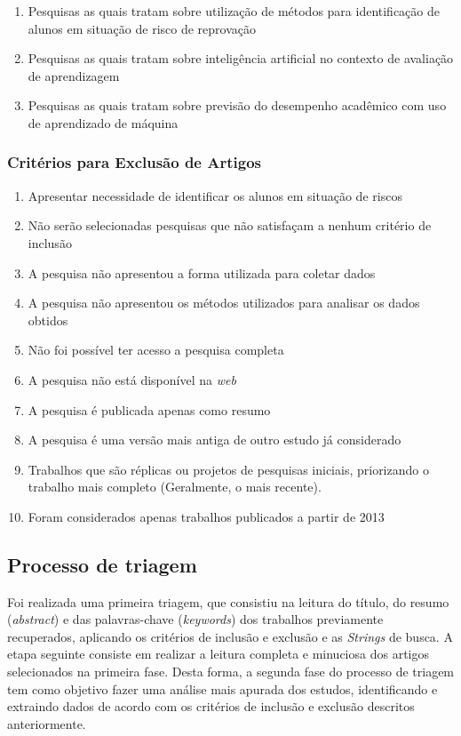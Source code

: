 \documentclass[
	12pt,				%
	openright,			%
	oneside,
	a4paper,			%
	english,			%
	french,				%
	spanish,			%
	brazil,				%
	]{abntex2}
\begin{document}
\begin{enumerate}
    \item Pesquisas as quais tratam sobre utilização de métodos para identificação de alunos em situação de risco de reprovação
    \item Pesquisas as quais tratam sobre inteligência artificial no contexto de avaliação de aprendizagem
    \item Pesquisas as quais tratam sobre previsão do desempenho acadêmico com uso de aprendizado de máquina
\end{enumerate}

\subsubsection{Critérios para Exclusão de Artigos}
\begin{enumerate}
    \item Apresentar necessidade de identificar os alunos em situação de riscos
    \item Não serão selecionadas pesquisas que não satisfaçam a nenhum critério de inclusão
    \item A pesquisa não apresentou a forma utilizada para coletar dados
    \item A pesquisa não apresentou os métodos utilizados para analisar os dados obtidos
    \item Não foi possível ter acesso a pesquisa completa
    \item A pesquisa não está disponível na \textit{web}
    \item A pesquisa é publicada apenas como resumo
    \item A pesquisa é uma versão mais antiga de outro estudo já considerado
    \item Trabalhos que são réplicas ou projetos de pesquisas iniciais, priorizando o trabalho mais completo (Geralmente, o mais recente).
    \item Foram considerados apenas trabalhos publicados a partir de 2013
\end{enumerate}

\subsection{Processo de triagem}
Foi realizada uma primeira triagem, que consistiu na leitura do título, do resumo (\textit{abstract}) e das palavras-chave (\textit{keywords}) dos trabalhos previamente recuperados, aplicando os critérios de inclusão e exclusão e as \textit{Strings} de busca.
A etapa seguinte consiste em  realizar a leitura completa e minuciosa dos artigos selecionados na primeira fase. Desta forma, a segunda fase do processo de triagem tem como objetivo fazer uma análise mais apurada dos estudos, identificando e extraindo dados de acordo com os critérios de inclusão e exclusão descritos anteriormente.
\end{document}
